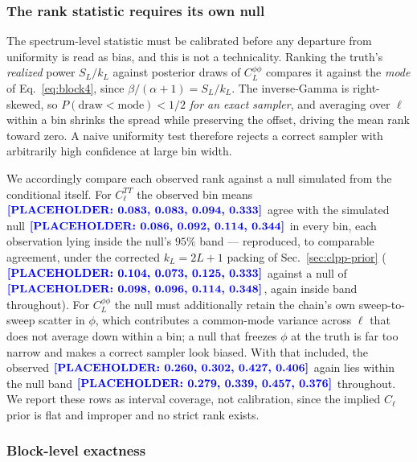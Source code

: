 \documentclass[twocolumn,superscriptaddress,aps,prl,floatfix]{revtex4-2}
\newcommand{\cl}{C_\ell}
\newcommand{\clpp}{C_L^{\phi\phi}}
\newcommand{\placeholder}[1]{\textcolor{blue}{\textbf{[PLACEHOLDER: #1]}}}
\begin{document}
\subsubsection*{The rank statistic requires its own null}

The spectrum-level statistic must be calibrated before any departure from
uniformity is read as bias, and this is not a technicality. Ranking the truth's
\emph{realized} power $S_L/k_L$ against posterior draws of $\clpp$ compares
it against the \emph{mode} of Eq.~\eqref{eq:block4}, since
$\beta/(\alpha+1) = S_L/k_L$. The inverse-Gamma is right-skewed, so
$P(\text{draw} < \text{mode}) < 1/2$ \emph{for an exact sampler}, and averaging
over $\ell$ within a bin shrinks the spread while preserving the offset, driving
the mean rank toward zero. A naive uniformity test therefore rejects a correct
sampler with arbitrarily high confidence at large bin width.

We accordingly compare each observed rank against a null simulated from the
conditional itself. For $\cl^{TT}$ the observed bin means
$\placeholder{0.083, 0.083, 0.094, 0.333}$ agree with the simulated null
$\placeholder{0.086, 0.092, 0.114, 0.344}$ in every bin, each observation
lying inside the null's $95\%$ band --- reproduced, to comparable agreement,
under the corrected $k_L=2L+1$ packing of Sec.~\ref{sec:clpp-prior}
($\placeholder{0.104, 0.073, 0.125, 0.333}$ against a null of
$\placeholder{0.098, 0.096, 0.114, 0.348}$, again inside band throughout).
For $\clpp$ the null
must additionally retain the chain's own sweep-to-sweep scatter in $\phi$,
which contributes a common-mode variance across $\ell$ that does not average
down within a bin; a null that freezes $\phi$ at the truth is far too narrow
and makes a correct sampler look biased. With that included, the observed
$\placeholder{0.260, 0.302, 0.427, 0.406}$ again lies within the null band
$\placeholder{0.279, 0.339, 0.457, 0.376}$ throughout. We report these rows as interval coverage, not calibration, since
the implied $\cl$ prior is flat and improper and no strict rank exists.

\subsubsection*{Block-level exactness}
\end{document}
